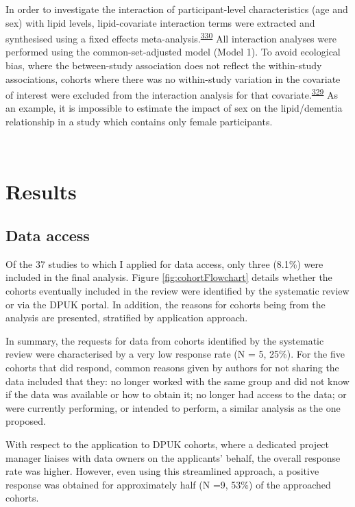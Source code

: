 \documentclass[a4paper, twoside]{templates/ociamthesis}
\begin{document}
In order to investigate the interaction of participant-level characteristics (age and sex) with lipid levels, lipid-covariate interaction terms were extracted and synthesised using a fixed effects meta-analysis.\textsuperscript{\protect\hyperlink{ref-fisher2017}{330}} All interaction analyses were performed using the common-set-adjusted model (Model 1). To avoid ecological bias, where the between-study association does not reflect the within-study associations, cohorts where there was no within-study variation in the covariate of interest were excluded from the interaction analysis for that covariate.\textsuperscript{\protect\hyperlink{ref-burke2017}{329}} As an example, it is impossible to estimate the impact of sex on the lipid/dementia relationship in a study which contains only female participants.

~

\hypertarget{results-1}{%
\section{Results}\label{results-1}}

\hypertarget{data-access}{%
\subsection{Data access}\label{data-access}}

Of the 37 studies to which I applied for data access, only three (8.1\%) were included in the final analysis. Figure \ref{fig:cohortFlowchart} details whether the cohorts eventually included in the review were identified by the systematic review or via the DPUK portal. In addition, the reasons for cohorts being from the analysis are presented, stratified by application approach.

In summary, the requests for data from cohorts identified by the systematic review were characterised by a very low response rate (N = 5, 25\%). For the five cohorts that did respond, common reasons given by authors for not sharing the data included that they: no longer worked with the same group and did not know if the data was available or how to obtain it; no longer had access to the data; or were currently performing, or intended to perform, a similar analysis as the one proposed.

With respect to the application to DPUK cohorts, where a dedicated project manager liaises with data owners on the applicants' behalf, the overall response rate was higher. However, even using this streamlined approach, a positive response was obtained for approximately half (N =9, 53\%) of the approached cohorts.
\end{document}
